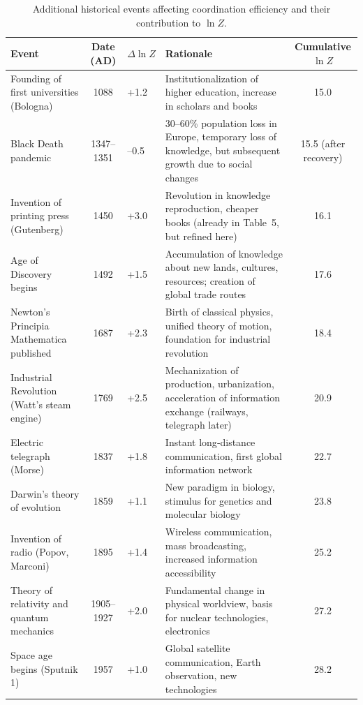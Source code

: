 \documentclass[12pt,a4paper]{article}
\theoremstyle{remark}
\begin{document}
	\begin{table}[htbp]
		\centering
		\caption{Additional historical events affecting coordination efficiency and their contribution to \(\ln Z\).}
		\label{tab:expanded-events}
		\scriptsize  
		\begin{tabular}{p{3.2cm} c p{2.5cm} p{4.5cm} c}
			\toprule
			\textbf{Event} & \textbf{Date (AD)} & \textbf{\(\Delta \ln Z\)} & \textbf{Rationale} & \textbf{Cumulative \(\ln Z\)} \\
			\midrule
			Founding of first universities (Bologna) & 1088 & +1.2 & Institutionalization of higher education, increase in scholars and books & 15.0 \\
			Black Death pandemic & 1347–1351 & –0.5 & 30–60\% population loss in Europe, temporary loss of knowledge, but subsequent growth due to social changes & 15.5 (after recovery) \\
			Invention of printing press (Gutenberg) & 1450 & +3.0 & Revolution in knowledge reproduction, cheaper books (already in Table~5, but refined here) & 16.1 \\
			Age of Discovery begins & 1492 & +1.5 & Accumulation of knowledge about new lands, cultures, resources; creation of global trade routes & 17.6 \\
			Newton's Principia Mathematica published & 1687 & +2.3 & Birth of classical physics, unified theory of motion, foundation for industrial revolution & 18.4 \\
			Industrial Revolution (Watt's steam engine) & 1769 & +2.5 & Mechanization of production, urbanization, acceleration of information exchange (railways, telegraph later) & 20.9 \\
			Electric telegraph (Morse) & 1837 & +1.8 & Instant long‑distance communication, first global information network & 22.7 \\
			Darwin's theory of evolution & 1859 & +1.1 & New paradigm in biology, stimulus for genetics and molecular biology & 23.8 \\
			Invention of radio (Popov, Marconi) & 1895 & +1.4 & Wireless communication, mass broadcasting, increased information accessibility & 25.2 \\
			Theory of relativity and quantum mechanics & 1905–1927 & +2.0 & Fundamental change in physical worldview, basis for nuclear technologies, electronics & 27.2 \\
			Space age begins (Sputnik 1) & 1957 & +1.0 & Global satellite communication, Earth observation, new technologies & 28.2 \\

\end{tabular}
\end{table}
\end{document}
